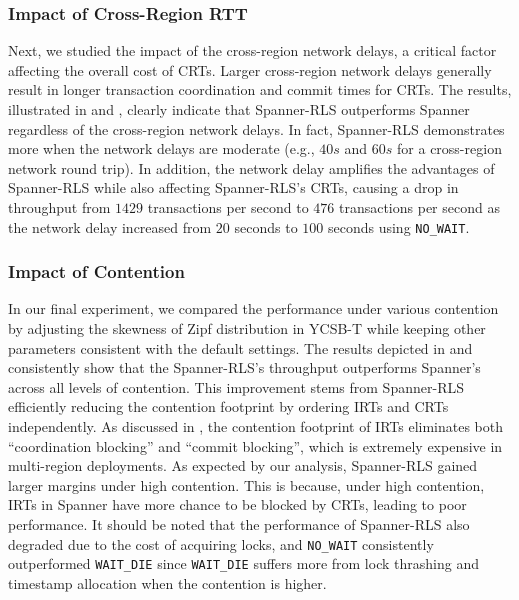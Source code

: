 \subsubsection{Impact of Cross-Region RTT} Next, we studied the impact of the cross-region network delays, a critical factor affecting the overall cost of CRTs. Larger cross-region network delays generally result in longer transaction coordination and commit times for CRTs. The results, illustrated in  and , clearly indicate that Spanner-RLS outperforms Spanner regardless of the cross-region network delays. In fact, Spanner-RLS demonstrates more when the network delays are moderate (e.g., $40s$ and $60s$ for a cross-region network round trip). In addition, the network delay amplifies the advantages of Spanner-RLS while also affecting Spanner-RLS's CRTs, causing a drop in throughput from $1429$ transactions per second to $476$ transactions per second as the network delay increased from $20$ seconds to $100$ seconds using \texttt{NO\_WAIT}.



\subsubsection{Impact of Contention} In our final experiment, we compared the performance under various contention by adjusting the skewness of Zipf distribution in YCSB-T while keeping other parameters consistent with the default settings. The results depicted in  and  consistently show that the Spanner-RLS's throughput outperforms Spanner's across all levels of contention. This improvement stems from Spanner-RLS efficiently reducing the contention footprint by ordering IRTs and CRTs independently. As discussed in , the contention footprint of IRTs eliminates both ``coordination blocking'' and ``commit blocking'', which is extremely expensive in multi-region deployments. As expected by our analysis, Spanner-RLS gained larger margins under high contention. This is because, under high contention, IRTs in Spanner have more chance to be blocked by CRTs, leading to poor performance. It should be noted that the performance of Spanner-RLS also degraded due to the cost of acquiring locks, and \texttt{NO\_WAIT} consistently outperformed \texttt{WAIT\_DIE} since \texttt{WAIT\_DIE} suffers more from lock thrashing and timestamp allocation when the contention is higher.

